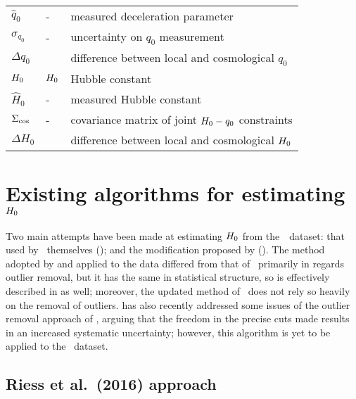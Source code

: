 \documentclass[a4paper,fleqn,usenatbib]{mnras}
\newcommand{\riess}{\citetalias{Riess_etal:2016}}
\newcommand{\decel}{\ensuremath{q_0}}
\newcommand{\dhubble}{\ensuremath{\Delta H_0}}
\newcommand{\ddecel}{\ensuremath{\Delta q_0}}
\newcommand{\hubblehat}{\ensuremath{\hat{H}_0}}
\newcommand{\decelhat}{\ensuremath{\hat{q}_0}}
\begin{document}
{\begin{table}
\begin{tabular}{lll}
$\decelhat$ &
  - &
      measured deceleration parameter \\
$\sigma_{\decel}$ &
  - &
      uncertainty on $\decel$ measurement \\
$\ddecel$ & &
      difference between local and cosmological $\decel$ \\
$H_0$ &
  $H_0$ &
      Hubble constant \\
$\hubblehat$ &
  - &
      measured Hubble constant \\
$\Sigma_{\rm cos}$ &
  - &
      covariance matrix of joint $\hubble-\decel$ constraints \\
$\dhubble$ & &
      difference between local and cosmological $H_0$ \\
\hline
\end{tabular}
\end{table}


\section{Existing algorithms for estimating $H_0$}
\label{section:existing_algorithms}

Two main attempts have been made at estimating $H_0$ from the~\riess\ dataset: that used by \riess\ themselves (); and the modification proposed by \cite{Cardona_etal:2016} ().  The method adopted by \citealt{Efstathiou:2014} and applied to the \cite{Riess_etal:2011} data differed from that of \riess\ primarily in regards outlier removal, but it has the same in statistical structure, so is effectively described in  as well; moreover, the updated method of \riess\ does not rely so heavily on the removal of outliers.  \cite{Zhang_etal:2017} has also recently addressed some issues of the outlier removal approach of \cite{Riess_etal:2011}, arguing that the freedom in the precise cuts made results in an increased systematic uncertainty; however, this algorithm is yet to be applied to the \riess\ dataset.


\subsection{Riess et al.\ (2016) approach}
\label{section:riess}

}
\end{document}
